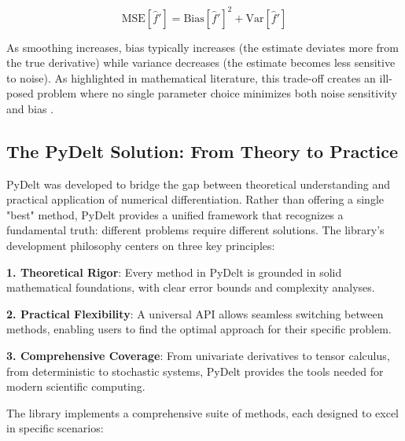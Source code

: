 \documentclass[10pt,journal,compsoc]{IEEEtran}
\begin{document}
\begin{equation}
    \text{MSE}[\hat{f}'] = \text{Bias}[\hat{f}']^2 + \text{Var}[\hat{f}']
\end{equation}

As smoothing increases, bias typically increases (the estimate deviates more from the true derivative) while variance decreases (the estimate becomes less sensitive to noise). As highlighted in mathematical literature, this trade-off creates an ill-posed problem where no single parameter choice minimizes both noise sensitivity and bias \cite{knowles1995variational}.

\subsection{The PyDelt Solution: From Theory to Practice}

PyDelt was developed to bridge the gap between theoretical understanding and practical application of numerical differentiation. Rather than offering a single "best" method, PyDelt provides a unified framework that recognizes a fundamental truth: different problems require different solutions. The library's development philosophy centers on three key principles:

\textbf{1. Theoretical Rigor}: Every method in PyDelt is grounded in solid mathematical foundations, with clear error bounds and complexity analyses.

\textbf{2. Practical Flexibility}: A universal API allows seamless switching between methods, enabling users to find the optimal approach for their specific problem.

\textbf{3. Comprehensive Coverage}: From univariate derivatives to tensor calculus, from deterministic to stochastic systems, PyDelt provides the tools needed for modern scientific computing.

The library implements a comprehensive suite of methods, each designed to excel in specific scenarios:
\end{document}
